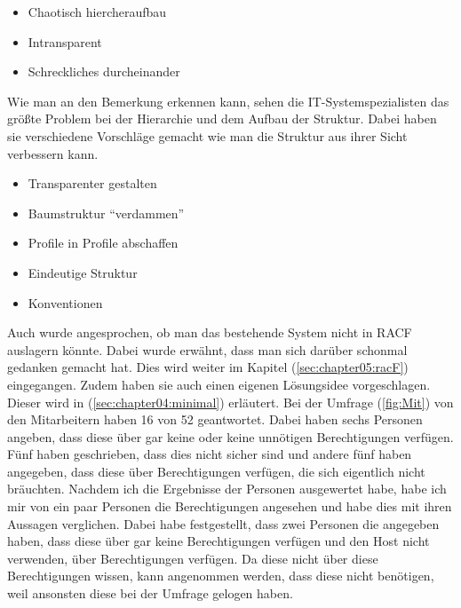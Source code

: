 \begin{itemize}
	\item Chaotisch hiercheraufbau
	\item Intransparent
	\item Schreckliches durcheinander
\end{itemize}

Wie man an den Bemerkung erkennen kann, sehen die IT-Systemspezialisten das größte Problem bei der Hierarchie und dem Aufbau der Struktur.
Dabei haben sie verschiedene Vorschläge gemacht wie man die Struktur aus ihrer Sicht verbessern kann.

\begin{itemize}
	\item Transparenter gestalten
	\item Baumstruktur "`verdammen"'
	\item Profile in Profile abschaffen
	\item Eindeutige Struktur
	\item Konventionen
\end{itemize}
Auch wurde angesprochen, ob man das bestehende System nicht in RACF auslagern könnte.
Dabei wurde erwähnt, dass man sich darüber schonmal gedanken gemacht hat.
Dies wird weiter im Kapitel (\ref{sec:chapter05:racF}) eingegangen.
Zudem haben sie auch einen eigenen Lösungsidee vorgeschlagen.
Dieser wird in (\ref{sec:chapter04:minimal}) erläutert.
\newline
\newline
Bei der Umfrage (\ref{fig:Mit}) von den Mitarbeitern haben 16 von 52 geantwortet.
Dabei haben sechs Personen angeben, dass diese über gar keine oder keine unnötigen Berechtigungen verfügen.
Fünf haben geschrieben, dass dies nicht sicher sind und andere fünf haben angegeben, dass diese über Berechtigungen verfügen, die sich eigentlich nicht bräuchten.
Nachdem ich die Ergebnisse der Personen ausgewertet habe, habe ich mir von ein paar Personen die Berechtigungen angesehen und habe dies mit ihren Aussagen verglichen.
Dabei habe festgestellt, dass zwei Personen die angegeben haben, dass diese über gar keine Berechtigungen verfügen und den Host nicht verwenden, über Berechtigungen verfügen.
Da diese nicht über diese Berechtigungen wissen, kann angenommen werden, dass diese nicht benötigen, weil ansonsten diese bei der Umfrage gelogen haben.
\newline
{}
\newline
